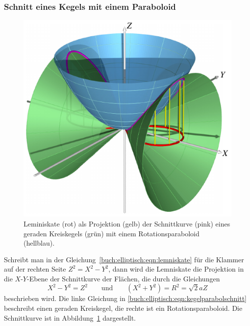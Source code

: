 \subsubsection{Schnitt eines Kegels mit einem Paraboloid}
\begin{figure}
\center
\includegraphics{chapters/110-elliptisch/images/kegelpara.pdf}
\caption{Leminiskate (rot) als Projektion (gelb) der Schnittkurve (pink)
eines geraden
Kreiskegels (grün) mit einem Rotationsparaboloid (hellblau).
\label{buch:elliptisch:lemniskate:kegelpara}}
\end{figure}%
%
%
Schreibt man in der Gleichung~\eqref{buch:elliptisch:eqn:lemniskate}
für die Klammer auf der rechten Seite $Z^2 = X^2 - Y^2$, dann wird die
Lemniskate die Projektion in die $X$-$Y$-Ebene der Schnittkurve der Flächen,
die durch die Gleichungen
\begin{equation}
X^2-Y^2 = Z^2
\qquad\text{und}\qquad
(X^2+Y^2) = R^2 = \!\sqrt{2}aZ
\label{buch:elliptisch:eqn:kegelparabolschnitt}
\end{equation}
beschrieben wird.
Die linke Gleichung in 
\eqref{buch:elliptisch:eqn:kegelparabolschnitt}
beschreibt einen geraden Kreiskegel, die rechte ist ein Rotationsparaboloid.
Die Schnittkurve ist in Abbildung~\ref{buch:elliptisch:lemniskate:kegelpara}
dargestellt.


